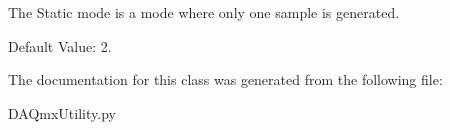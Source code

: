 The Static mode is a mode where only one sample is generated. 

Default Value\-: 2. 

The documentation for this class was generated from the following file\-:\begin{DoxyCompactItemize}
\item 
D\-A\-Qmx\-Utility.\-py\end{DoxyCompactItemize}
